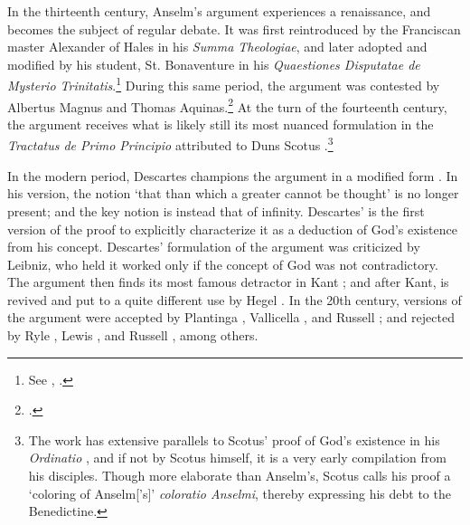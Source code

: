 \documentclass[]{amsart}
\begin{document}
In the thirteenth century, Anselm's argument experiences a renaissance, and becomes the subject of regular debate. It was first reintroduced by the Franciscan master Alexander of Hales in his \textit{Summa Theologiae}, and later adopted and modified by his student, St. Bonaventure in his \textit{Quaestiones Disputatae de Mysterio Trinitatis}.\footnote{See \cite[\textit{myst. trin.} q. 1, art. i]{BonaventureTrinity}, \cite{Seifert1992}.} During this same period, the argument was contested by Albertus Magnus and Thomas Aquinas.\footnote{\cite[ST Ia, q. 2, art. 2]{AquinasST}.} At the turn of the fourteenth century, the argument receives what is likely still its most nuanced formulation in the \textit{Tractatus de Primo Principio}  attributed to Duns Scotus \cite{Scotus1966}.\footnote{The work has extensive parallels to Scotus' proof of God's existence in his \textit{Ordinatio} \cite{ScotusOrd}, and if not by Scotus himself, it is a very early compilation from his disciples. Though more elaborate than Anselm's, Scotus calls his proof a `coloring of Anselm['s]' \textit{coloratio Anselmi}, thereby expressing his debt to the Benedictine.}

In the modern period, Descartes champions the argument in a modified form \cite{Meditations}. In his version, the notion `that than which a greater cannot be thought' is no longer present; and the key notion is instead that of infinity. Descartes' is the first version of the proof to explicitly characterize it as a deduction of God's existence from his concept. Descartes' formulation of the argument was criticized by Leibniz, who held it worked only if the concept of God was not contradictory. The argument then finds its most famous detractor in Kant \cite{KantCritique1}; and after Kant, is revived and put to a quite different use by Hegel \cite[par. 1530-1533]{HegelLogic}. In the 20th century, versions of the argument were accepted by Plantinga \cite{Plantinga1965}, Vallicella \cite{Vallicella2000}, and Russell \cite{RussellAutobio}; and rejected by Ryle \cite{Ryle2009}, Lewis \cite{Lewis1970}, and Russell \cite{RussellAutobio}, among others.
\end{document}
